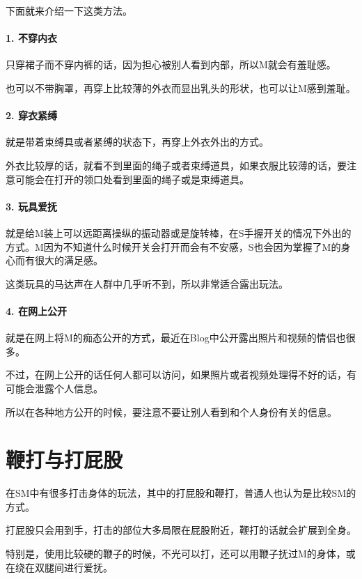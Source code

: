 \documentclass[12pt,UTF8]{ctexbook}
\begin{document}
下面就来介绍一下这类方法。

\paragraph{1. 不穿内衣}

只穿裙子而不穿内裤的话，因为担心被别人看到内部，所以M就会有羞耻感。

也可以不带胸罩，再穿上比较薄的外衣而显出乳头的形状，也可以让M感到羞耻。

\paragraph{2. 穿衣紧缚}

就是带着束缚具或者紧缚的状态下，再穿上外衣外出的方式。

外衣比较厚的话，就看不到里面的绳子或者束缚道具，如果衣服比较薄的话，要注意可能会在打开的领口处看到里面的绳子或是束缚道具。

\paragraph{3. 玩具爱抚}

就是给M装上可以远距离操纵的振动器或是旋转棒，在S手握开关的情况下外出的方式。M因为不知道什么时候开关会打开而会有不安感，S也会因为掌握了M的身心而有很大的满足感。

这类玩具的马达声在人群中几乎听不到，所以非常适合露出玩法。

\paragraph{4. 在网上公开}

就是在网上将M的痴态公开的方式，最近在Blog中公开露出照片和视频的情侣也很多。

不过，在网上公开的话任何人都可以访问，如果照片或者视频处理得不好的话，有可能会泄露个人信息。

所以在各种地方公开的时候，要注意不要让别人看到和个人身份有关的信息。

\section{鞭打与打屁股}

在SM中有很多打击身体的玩法，其中的打屁股和鞭打，普通人也认为是比较SM的方式。

打屁股只会用到手，打击的部位大多局限在屁股附近，鞭打的话就会扩展到全身。

特别是，使用比较硬的鞭子的时候，不光可以打，还可以用鞭子抚过M的身体，或在绕在双腿间进行爱抚。
\end{document}
